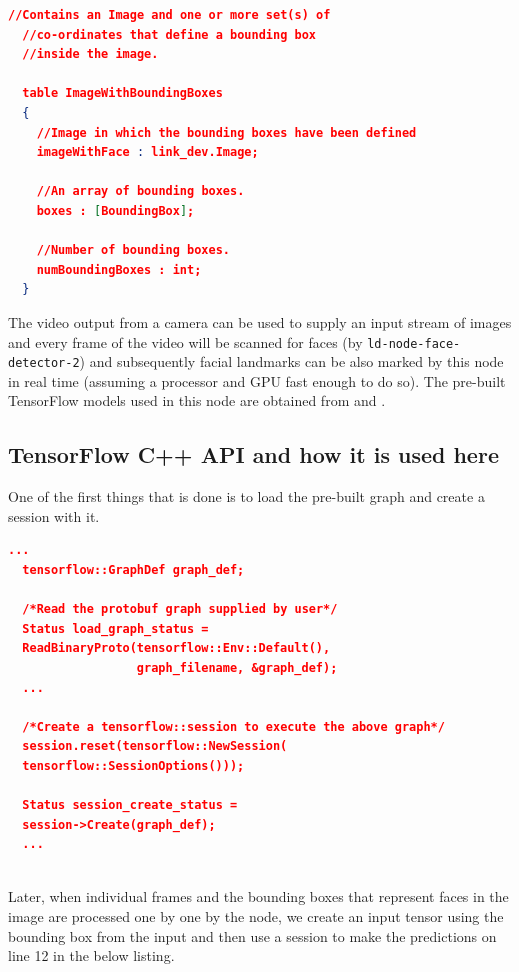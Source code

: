 \documentclass[a4paper, 12pt, oneside]{report}
\begin{document}
  \begin{lstlisting}[language=json,firstnumber=1]
  //Contains an Image and one or more set(s) of 
  //co-ordinates that define a bounding box 
  //inside the image.
  
  table ImageWithBoundingBoxes
  {
    //Image in which the bounding boxes have been defined
    imageWithFace : link_dev.Image;  
    
    //An array of bounding boxes.
    boxes : [BoundingBox];       
  
    //Number of bounding boxes.
    numBoundingBoxes : int;          
  }
  \end{lstlisting}
  
  The video output from a camera can be used to supply an input stream of images and every frame of the video will be scanned for faces (by \texttt{ld-node-face-detector-2}) and subsequently facial landmarks can be also marked by this node in real time (assuming a processor and GPU fast enough to do so). The pre-built TensorFlow models used in this node are obtained from \cite{feng2018prn} and \cite{lighttransportprnetinferC11portofYadiraFsPRNetinferenceonly-2020-02-18}.
  
  \subsection{TensorFlow C++ API and how it is used here}
  
  One of the first things that is done is to load the pre-built graph \cite{ImportingaTensorFlowGraphDefbasedModelsintoTensorFlowjs-2020-01-09} and create a session \cite{tensorflowClientSessionClassReferenceTensorFlowCorev210-2020-02-14} with it. 
  
  \begin{lstlisting}[language=json,firstnumber=1]
  ...
  tensorflow::GraphDef graph_def;
  
  /*Read the protobuf graph supplied by user*/
  Status load_graph_status = 
  ReadBinaryProto(tensorflow::Env::Default(), 
                  graph_filename, &graph_def);
  ...
  
  /*Create a tensorflow::session to execute the above graph*/
  session.reset(tensorflow::NewSession(
  tensorflow::SessionOptions()));
  
  Status session_create_status = 
  session->Create(graph_def);
  ...
  
  \end{lstlisting}
  
  Later, when individual frames and the bounding boxes that represent faces in the image are processed one by one by the node, we create an input tensor using the bounding box from the input and then use a session to make the predictions on line 12 in the below listing.
  
\end{document}
